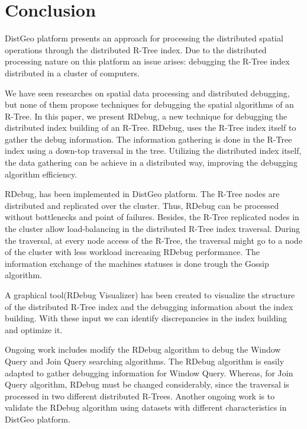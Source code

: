 \section{Conclusion}
\label{sec:conclusion}

DistGeo platform presents an approach for processing the distributed spatial operations through the distributed R-Tree index. 
Due to the distributed processing nature on this platform an issue arises: debugging the R-Tree index distributed in a cluster of computers.

We have seen researches on spatial data processing and distributed debugging, but none of them propose techniques for debugging the spatial algorithms of an R-Tree. 
In this paper, we present RDebug, a new technique for debugging the distributed index building of an R-Tree. RDebug, uses the R-Tree index itself to gather the debug information. 
The information gathering is done in the R-Tree index using a down-top traversal in the tree. 
Utilizing the distributed index itself, the data gathering can be achieve in a distributed way, improving the debugging algorithm efficiency.

RDebug, has been implemented in DistGeo platform. The R-Tree nodes are distributed and replicated over the cluster. Thus, RDebug can be processed without bottlenecks and point of failures. 
Besides, the R-Tree replicated nodes in the cluster allow load-balancing in the distributed R-Tree index traversal. 
During the traversal, at every node access of the R-Tree, the traversal might go to a node of the cluster with less workload increasing RDebug performance. 
The information exchange of the machines statuses is done trough the Gossip algorithm.

A graphical tool(RDebug Visualizer) has been created to visualize the structure of the distributed R-Tree index and the debugging information about the index building. 
With these input we can identify discrepancies in the index building and optimize it.

Ongoing work includes modify the RDebug algorithm to debug the Window Query and Join Query searching algorithms. 
The RDebug algorithm is easily adapted to gather debugging information for Window Query. 
Whereas, for Join Query algorithm, RDebug must be changed considerably, since the traversal is processed in two different distributed R-Trees. 
Another ongoing work is to validate the RDebug algorithm using datasets with different characteristics in DistGeo platform.